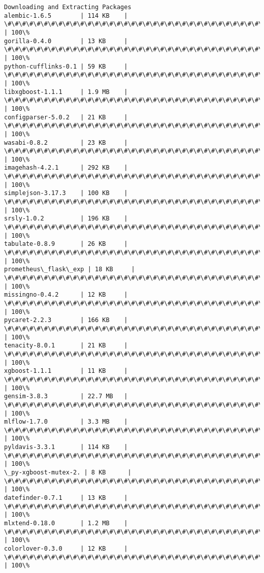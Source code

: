 \documentclass[11pt]{article}
\begin{document}
\begin{Verbatim}[commandchars=\\\{\}]
Downloading and Extracting Packages
alembic-1.6.5        | 114 KB    | \#\#\#\#\#\#\#\#\#\#\#\#\#\#\#\#\#\#\#\#\#\#\#\#\#\#\#\#\#\#\#\#\#\#\#\#\# | 100\%
gorilla-0.4.0        | 13 KB     | \#\#\#\#\#\#\#\#\#\#\#\#\#\#\#\#\#\#\#\#\#\#\#\#\#\#\#\#\#\#\#\#\#\#\#\#\# | 100\%
python-cufflinks-0.1 | 59 KB     | \#\#\#\#\#\#\#\#\#\#\#\#\#\#\#\#\#\#\#\#\#\#\#\#\#\#\#\#\#\#\#\#\#\#\#\#\# | 100\%
libxgboost-1.1.1     | 1.9 MB    | \#\#\#\#\#\#\#\#\#\#\#\#\#\#\#\#\#\#\#\#\#\#\#\#\#\#\#\#\#\#\#\#\#\#\#\#\# | 100\%
configparser-5.0.2   | 21 KB     | \#\#\#\#\#\#\#\#\#\#\#\#\#\#\#\#\#\#\#\#\#\#\#\#\#\#\#\#\#\#\#\#\#\#\#\#\# | 100\%
wasabi-0.8.2         | 23 KB     | \#\#\#\#\#\#\#\#\#\#\#\#\#\#\#\#\#\#\#\#\#\#\#\#\#\#\#\#\#\#\#\#\#\#\#\#\# | 100\%
imagehash-4.2.1      | 292 KB    | \#\#\#\#\#\#\#\#\#\#\#\#\#\#\#\#\#\#\#\#\#\#\#\#\#\#\#\#\#\#\#\#\#\#\#\#\# | 100\%
simplejson-3.17.3    | 100 KB    | \#\#\#\#\#\#\#\#\#\#\#\#\#\#\#\#\#\#\#\#\#\#\#\#\#\#\#\#\#\#\#\#\#\#\#\#\# | 100\%
srsly-1.0.2          | 196 KB    | \#\#\#\#\#\#\#\#\#\#\#\#\#\#\#\#\#\#\#\#\#\#\#\#\#\#\#\#\#\#\#\#\#\#\#\#\# | 100\%
tabulate-0.8.9       | 26 KB     | \#\#\#\#\#\#\#\#\#\#\#\#\#\#\#\#\#\#\#\#\#\#\#\#\#\#\#\#\#\#\#\#\#\#\#\#\# | 100\%
prometheus\_flask\_exp | 18 KB     | \#\#\#\#\#\#\#\#\#\#\#\#\#\#\#\#\#\#\#\#\#\#\#\#\#\#\#\#\#\#\#\#\#\#\#\#\# | 100\%
missingno-0.4.2      | 12 KB     | \#\#\#\#\#\#\#\#\#\#\#\#\#\#\#\#\#\#\#\#\#\#\#\#\#\#\#\#\#\#\#\#\#\#\#\#\# | 100\%
pycaret-2.2.3        | 166 KB    | \#\#\#\#\#\#\#\#\#\#\#\#\#\#\#\#\#\#\#\#\#\#\#\#\#\#\#\#\#\#\#\#\#\#\#\#\# | 100\%
tenacity-8.0.1       | 21 KB     | \#\#\#\#\#\#\#\#\#\#\#\#\#\#\#\#\#\#\#\#\#\#\#\#\#\#\#\#\#\#\#\#\#\#\#\#\# | 100\%
xgboost-1.1.1        | 11 KB     | \#\#\#\#\#\#\#\#\#\#\#\#\#\#\#\#\#\#\#\#\#\#\#\#\#\#\#\#\#\#\#\#\#\#\#\#\# | 100\%
gensim-3.8.3         | 22.7 MB   | \#\#\#\#\#\#\#\#\#\#\#\#\#\#\#\#\#\#\#\#\#\#\#\#\#\#\#\#\#\#\#\#\#\#\#\#\# | 100\%
mlflow-1.7.0         | 3.3 MB    | \#\#\#\#\#\#\#\#\#\#\#\#\#\#\#\#\#\#\#\#\#\#\#\#\#\#\#\#\#\#\#\#\#\#\#\#\# | 100\%
pyldavis-3.3.1       | 114 KB    | \#\#\#\#\#\#\#\#\#\#\#\#\#\#\#\#\#\#\#\#\#\#\#\#\#\#\#\#\#\#\#\#\#\#\#\#\# | 100\%
\_py-xgboost-mutex-2. | 8 KB      | \#\#\#\#\#\#\#\#\#\#\#\#\#\#\#\#\#\#\#\#\#\#\#\#\#\#\#\#\#\#\#\#\#\#\#\#\# | 100\%
datefinder-0.7.1     | 13 KB     | \#\#\#\#\#\#\#\#\#\#\#\#\#\#\#\#\#\#\#\#\#\#\#\#\#\#\#\#\#\#\#\#\#\#\#\#\# | 100\%
mlxtend-0.18.0       | 1.2 MB    | \#\#\#\#\#\#\#\#\#\#\#\#\#\#\#\#\#\#\#\#\#\#\#\#\#\#\#\#\#\#\#\#\#\#\#\#\# | 100\%
colorlover-0.3.0     | 12 KB     | \#\#\#\#\#\#\#\#\#\#\#\#\#\#\#\#\#\#\#\#\#\#\#\#\#\#\#\#\#\#\#\#\#\#\#\#\# | 100\%

\end{Verbatim}
\end{document}
